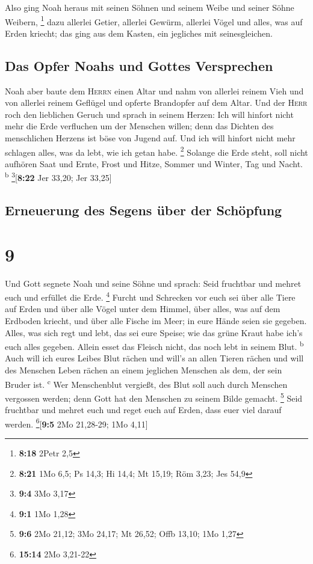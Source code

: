 Also ging Noah heraus mit seinen Söhnen und seinem Weibe
und seiner Söhne Weibern, \footnote{\textbf{8:18} 2Petr 2,5}
 dazu allerlei Getier, allerlei Gewürm, allerlei Vögel
und alles, was auf Erden kriecht; das ging aus dem Kasten, ein jegliches
mit seinesgleichen.

\hypertarget{das-opfer-noahs-und-gottes-versprechen}{%
\subsection{Das Opfer Noahs und Gottes
Versprechen}\label{das-opfer-noahs-und-gottes-versprechen}}

 Noah aber baute dem \textsc{Herrn} einen Altar und nahm
von allerlei reinem Vieh und von allerlei reinem Geflügel und opferte
Brandopfer auf dem Altar.  Und der \textsc{Herr} roch den
lieblichen Geruch und sprach in seinem Herzen: Ich will hinfort nicht
mehr die Erde verfluchen um der Menschen willen; denn das Dichten des
menschlichen Herzens ist böse von Jugend auf. Und ich will hinfort nicht
mehr schlagen alles, was da lebt, wie ich getan habe. \footnote{\textbf{8:21}
  1Mo 6,5; Ps 14,3; Hi 14,4; Mt 15,19; Röm 3,23; Jes 54,9}
 Solange die Erde steht, soll nicht aufhören Saat und
Ernte, Frost und Hitze, Sommer und Winter, Tag und Nacht.
\textsuperscript{b} \footnote{\textbf{9:4} 3Mo 3,17}{[}\textbf{8:22} Jer
33,20; Jer 33,25{]}

\hypertarget{erneuerung-des-segens-uxfcber-der-schuxf6pfung}{%
\subsection{Erneuerung des Segens über der
Schöpfung}\label{erneuerung-des-segens-uxfcber-der-schuxf6pfung}}

\hypertarget{section-8}{%
\section{9}\label{section-8}}

 Und Gott segnete Noah und seine Söhne und sprach: Seid
fruchtbar und mehret euch und erfüllet die Erde. \footnote{\textbf{9:1}
  1Mo 1,28}  Furcht und Schrecken vor euch sei über alle
Tiere auf Erden und über alle Vögel unter dem Himmel, über alles, was
auf dem Erdboden kriecht, und über alle Fische im Meer; in eure Hände
seien sie gegeben.  Alles, was sich regt und lebt, das sei
eure Speise; wie das grüne Kraut habe ich's euch alles gegeben.
 Allein esset das Fleisch nicht, das noch lebt in seinem
Blut. \textsuperscript{b}  Auch will ich eures Leibes Blut
rächen und will's an allen Tieren rächen und will des Menschen Leben
rächen an einem jeglichen Menschen als dem, der sein Bruder ist.
\textsuperscript{c}  Wer Menschenblut vergießt, des Blut
soll auch durch Menschen vergossen werden; denn Gott hat den Menschen zu
seinem Bilde gemacht. \footnote{\textbf{9:6} 2Mo 21,12; 3Mo 24,17; Mt
  26,52; Offb 13,10; 1Mo 1,27}  Seid fruchtbar und mehret
euch und reget euch auf Erden, dass euer viel darauf werden.
\footnote{\textbf{15:14} 2Mo 3,21-22}{[}\textbf{9:5} 2Mo 21,28-29; 1Mo
4,11{]}

